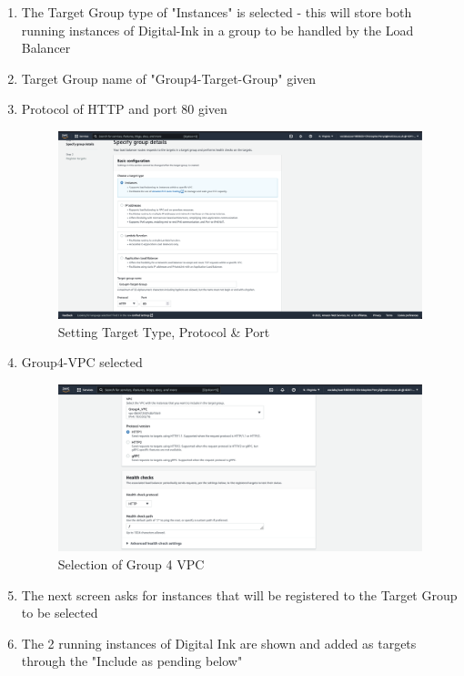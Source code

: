 \begin{enumerate}
	\item The Target Group type of "Instances" is selected - this will store both running instances of Digital-Ink in a group
	      to be handled by the Load Balancer
	\item Target Group name of "Group4-Target-Group" given
	\item Protocol of HTTP and port 80 given \begin{figure}[H]
												 \centering
												 \includegraphics[width=\textwidth]{resources/elb/elb-target-group-basic-config.png}
												 \caption{Setting Target Type, Protocol \& Port}
												 \label{fig:elb-target-group-basic-config}
	\end{figure}
	\pagebreak
	\item Group4-VPC selected \begin{figure}[H]
	      \centering
	      \includegraphics[width=\textwidth]{resources/elb/elb-vpc.png}
	      \caption{Selection of Group 4 VPC}
	      \label{fig:elb-vpc}
	\end{figure}
	\item The next screen asks for instances that will be registered to the Target Group to be selected
	\item The 2 running instances of Digital Ink are shown and added as targets through the "Include as pending below"

\end{enumerate}
